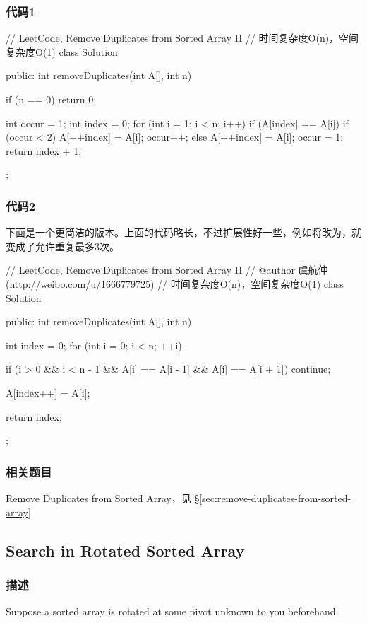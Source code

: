 \subsubsection{代码1}
\begin{Code}
// LeetCode, Remove Duplicates from Sorted Array II
// 时间复杂度O(n)，空间复杂度O(1)
class Solution {
public:
    int removeDuplicates(int A[], int n) {
        if (n == 0) return 0;

        int occur = 1;
        int index = 0;
        for (int i = 1; i < n; i++) {
            if (A[index] == A[i]) {
                if (occur < 2) {
                    A[++index] = A[i];
                    occur++;
                }
            } else {
                A[++index] = A[i];
                occur = 1;
            }
        }
        return index + 1;
    }
};
\end{Code}


\subsubsection{代码2}
下面是一个更简洁的版本。上面的代码略长，不过扩展性好一些，例如将改为，就变成了允许重复最多3次。
\begin{Code}
// LeetCode, Remove Duplicates from Sorted Array II
// @author 虞航仲 (http://weibo.com/u/1666779725)
// 时间复杂度O(n)，空间复杂度O(1)
class Solution {
public:
    int removeDuplicates(int A[], int n) {
        int index = 0;
        for (int i = 0; i < n; ++i) {
            if (i > 0 && i < n - 1 && A[i] == A[i - 1] && A[i] == A[i + 1])
                continue;

            A[index++] = A[i];
        }
        return index;
    }
};
\end{Code}


\subsubsection{相关题目}

\begindot
\item Remove Duplicates from Sorted Array，见 \S \ref{sec:remove-duplicates-from-sorted-array}
\myenddot


\subsection{Search in Rotated Sorted Array}
\label{sec:search-in-rotated-sorted-array}


\subsubsection{描述}
Suppose a sorted array is rotated at some pivot unknown to you beforehand.

